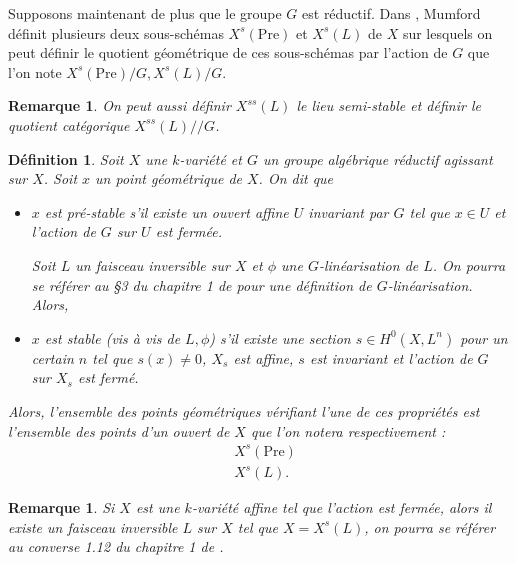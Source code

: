 \documentclass[11pt]{article}
\newcommand{\Pre}{\mathrm{Pre}}
\newtheorem{defi}[thm]{Définition}
\newtheorem{rem}[thm]{Remarque}
\begin{document}
Supposons maintenant de plus que le groupe $G$ est réductif. Dans \cite{GIT}, Mumford définit plusieurs deux sous-schémas $X^s(\Pre)$ et $X^s(L)$ de $X$ sur lesquels on peut définir le quotient géométrique de ces sous-schémas par l'action de $G$ que l'on note $X^s(\Pre)/G, X^s(L)/G$. 

\begin{rem}
On peut aussi définir $X^{ss}(L)$ le lieu semi-stable et définir le quotient catégorique $X^{ss}(L)/\! /G$.
\end{rem}

\begin{defi}\label{Définition lieu stable}
Soit $X$ une $k$-variété et $G$ un groupe algébrique réductif agissant sur $X$. Soit $x$ un point géométrique de $X$. On dit que 
\begin{itemize}
\item $x$ est pré-stable s'il existe un ouvert affine $U$ invariant par $G$ tel que $x\in U$ et l'action de $G$ sur $U$ est fermée.

Soit $L$ un faisceau inversible sur $X$ et $\phi$ une $G$-linéarisation de $L$. On pourra se référer au §3 du chapitre 1 de \cite{GIT} pour une définition de $G$-linéarisation. Alors,
\item $x$ est stable (vis à vis de $L, \phi$) s'il existe une section $s \in H^0(X,L^n)$ pour un certain $n$ tel que $s(x) \neq 0$, $X_s$ est affine, $s$ est invariant et l'action de $G$ sur $X_s$ est fermé. 
\end{itemize}

Alors, l'ensemble des points géométriques vérifiant l'une de ces propriétés est l'ensemble des points d'un ouvert de $X$ que l'on notera respectivement : 
\begin{align*}
&X^{s}(\Pre)\\
&X^s(L).
\end{align*}
\end{defi}

\begin{rem}\label{Cas affine, toute la variete est lieu stable}
Si $X$ est une $k$-variété affine tel que l'action est fermée, alors il existe un faisceau inversible $L$ sur $X$ tel que $X = X^s(L)$, on pourra se référer au converse 1.12 du chapitre 1 de \cite{GIT}.
\end{rem}
\end{document}
